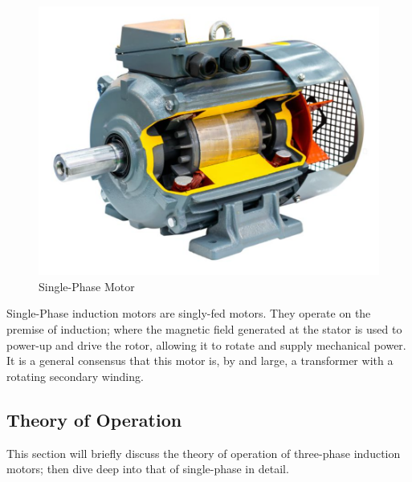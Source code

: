 \documentclass[journal]{IEEEtran}
\begin{document}
\begin{figure}[h]
    \centering
    \includegraphics[scale=0.27]{Induction/single-phase-induction-motor.PNG}
    \caption{Single-Phase Motor \cite{single_phase_ind}}
\end{figure}
Single-Phase induction motors are singly-fed motors. They operate on the premise of induction; where the magnetic field generated at the stator is used to power-up and drive the rotor, allowing it to rotate and supply mechanical power. It is a general consensus that this motor is, by and large, a transformer with a rotating secondary winding.
\subsection{Theory of Operation}
This section will briefly discuss the theory of operation of three-phase induction motors; then dive deep into that of single-phase in detail.
\end{document}
